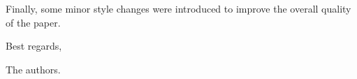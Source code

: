 \documentclass{letter}
\begin{document}
\begin{letter}{}
  
  
  Finally, some minor style changes were introduced to improve the overall quality of the paper.
  
  Best regards,

  The authors.
\end{letter}
\end{document}
